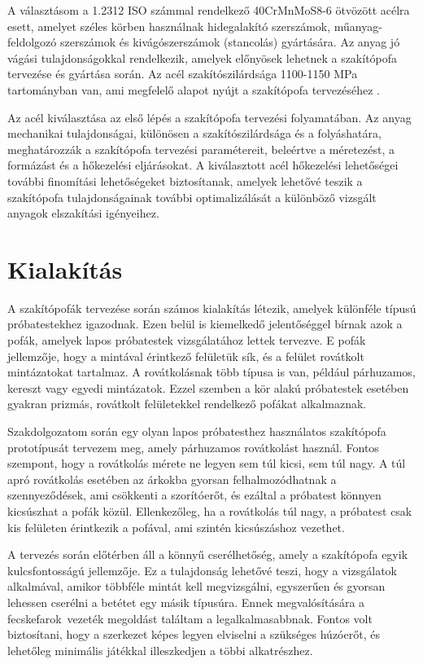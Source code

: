 \documentclass[12pt,a4paper,oneside]{report}
\begin{document}
A választásom a 1.2312 ISO számmal rendelkező 40CrMnMoS8-6 ötvözött acélra esett, amelyet széles körben használnak hidegalakító szerszámok, műanyag-feldolgozó szerszámok és kivágószerszámok (stancolás) gyártására. Az anyag jó vágási tulajdonságokkal rendelkezik, amelyek előnyösek lehetnek a szakítópofa tervezése és gyártása során. Az acél szakítószilárdsága 1100-1150 MPa tartományban van, ami megfelelő alapot nyújt a szakítópofa tervezéséhez \cite{fenyvesi2015muszaki}.

Az acél kiválasztása az első lépés a szakítópofa tervezési folyamatában. Az anyag mechanikai tulajdonságai, különösen a szakítószilárdsága és a folyáshatára, meghatározzák a szakítópofa tervezési paramétereit, beleértve a méretezést, a formázást és a hőkezelési eljárásokat. A kiválasztott acél hőkezelési lehetőségei további finomítási lehetőségeket biztosítanak, amelyek lehetővé teszik a szakítópofa tulajdonságainak további optimalizálását a különböző vizsgált anyagok elszakítási igényeihez.
\newpage

\section{Kialakítás}
A szakítópofák tervezése során számos kialakítás létezik, amelyek különféle típusú próbatestekhez igazodnak. Ezen belül is kiemelkedő jelentőséggel bírnak azok a pofák, amelyek lapos próbatestek vizsgálatához lettek tervezve. E pofák jellemzője, hogy a mintával érintkező felületük sík, és a felület rovátkolt mintázatokat tartalmaz. A rovátkolásnak több típusa is van, például párhuzamos, kereszt vagy egyedi mintázatok. Ezzel szemben a kör alakú próbatestek esetében gyakran prizmás, rovátkolt felületekkel rendelkező pofákat alkalmaznak.

Szakdolgozatom során egy olyan lapos próbatesthez használatos szakítópofa prototípusát tervezem meg, amely párhuzamos rovátkolást használ. Fontos szempont, hogy a rovátkolás mérete ne legyen sem túl kicsi, sem túl nagy. A túl apró rovátkolás esetében az árkokba gyorsan felhalmozódhatnak a szennyeződések, ami csökkenti a szorítóerőt, és ezáltal a próbatest könnyen kicsúszhat a pofák közül. Ellenkezőleg, ha a rovátkolás túl nagy, a próbatest csak kis felületen érintkezik a pofával, ami szintén kicsúszáshoz vezethet.

A tervezés során előtérben áll a könnyű cserélhetőség, amely a szakítópofa egyik kulcsfontosságú jellemzője. Ez a tulajdonság lehetővé teszi, hogy a vizsgálatok alkalmával, amikor többféle mintát kell megvizsgálni, egyszerűen és gyorsan lehessen cserélni a betétet egy másik típusúra. Ennek megvalósítására a \glqq fecskefarok\grqq\ vezeték megoldást találtam a legalkalmasabbnak. Fontos volt biztosítani, hogy a szerkezet képes legyen elviselni a szükséges húzóerőt, és lehetőleg minimális játékkal illeszkedjen a többi alkatrészhez.
\end{document}
